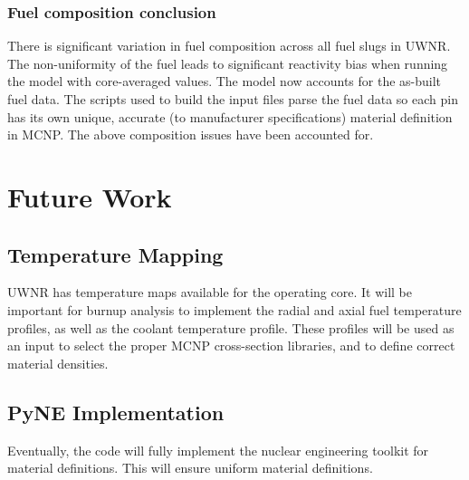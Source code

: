 \documentclass{UWNR_modeling}
\begin{document}
\subsubsection{Fuel composition conclusion}

There is significant variation in fuel composition across all fuel slugs in UWNR. The non-uniformity of the fuel leads to significant reactivity bias when running the model with core-averaged values. The model now accounts for the as-built fuel data. The scripts used to build the input files parse the fuel data so each pin has its own unique, accurate (to manufacturer specifications) material definition in MCNP. The above composition issues have been accounted for.
 







\section{Future Work}

\subsection{Temperature Mapping}

UWNR has temperature maps available for the operating core. It will be important for burnup analysis to implement the radial and axial fuel temperature profiles, as well as the coolant temperature profile. These profiles will be used as an input to select the proper MCNP cross-section libraries, and to define correct material densities. 

\subsection{PyNE Implementation}

Eventually, the code will fully implement the nuclear engineering toolkit for material definitions. This will ensure uniform material definitions.






\setlength{\baselineskip}{12pt}



\end{document}
